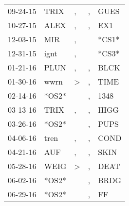 \begin{supertabular}{p{0.07\textwidth}p{0.06\textwidth}p{0.02\textwidth}p{0.02\textwidth}p{0.06\textwidth}}
          09-24-15\textsuperscript{} &           TRIX\textsuperscript{} &                , &                , &           GUES\textsuperscript{} \\
          10-27-15\textsuperscript{} &           ALEX\textsuperscript{} &                , &                , &            EX1\textsuperscript{} \\
          12-03-15\textsuperscript{} &            MIR\textsuperscript{} &                , &                  &                            *CS1* \\
          12-31-15\textsuperscript{} &           ignt\textsuperscript{} &                , &                  &                            *CS3* \\
          01-21-16\textsuperscript{} &           PLUN\textsuperscript{} &                , &                , &           BLCK\textsuperscript{} \\
          01-30-16\textsuperscript{} &           wwrn\textsuperscript{} &     \textgreater &                , &           TIME\textsuperscript{} \\
          02-14-16\textsuperscript{} &                            *OS2* &                  &                , &           1348\textsuperscript{} \\
          03-13-16\textsuperscript{} &           TRIX\textsuperscript{} &                , &                , &           HIGG\textsuperscript{} \\
          03-26-16\textsuperscript{} &                            *OS2* &                  &                , &           PUPS\textsuperscript{} \\
          04-06-16\textsuperscript{} &           tren\textsuperscript{} &                , &                , &           COND\textsuperscript{} \\
          04-21-16\textsuperscript{} &            AUF\textsuperscript{} &                , &                , &           SKIN\textsuperscript{} \\
          05-28-16\textsuperscript{} &           WEIG\textsuperscript{} &     \textgreater &                , &           DEAT\textsuperscript{} \\
          06-02-16\textsuperscript{} &                            *OS2* &                  &                , &           BRDG\textsuperscript{} \\
          06-29-16\textsuperscript{} &                            *OS2* &                  &                , &             FF\textsuperscript{} \\

\end{supertabular}
